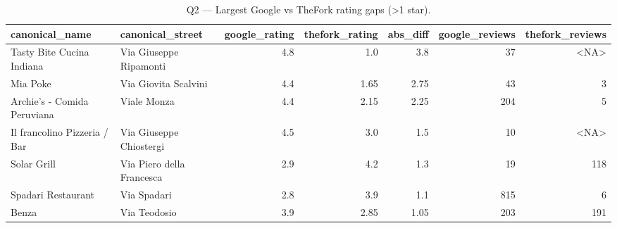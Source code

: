 \begin{table}[ht]
\centering
\caption{Q2 — Largest Google vs TheFork rating gaps (>1 star).}
\label{tab:q2_top_google_vs_thefork}
{\tiny
\begin{tabular}{llrrrrr}
\toprule
canonical\_name & canonical\_street & google\_rating & thefork\_rating & abs\_diff & google\_reviews & thefork\_reviews \\
\midrule
Tasty Bite Cucina Indiana & Via Giuseppe Ripamonti & 4.8 & 1.0 & 3.8 & 37 & <NA> \\
Mia Poke & Via Giovita Scalvini & 4.4 & 1.65 & 2.75 & 43 & 3 \\
Archie’s - Comida Peruviana & Viale Monza & 4.4 & 2.15 & 2.25 & 204 & 5 \\
Il francolino Pizzeria / Bar & Via Giuseppe Chiostergi & 4.5 & 3.0 & 1.5 & 10 & <NA> \\
Solar Grill & Via Piero della Francesca & 2.9 & 4.2 & 1.3 & 19 & 118 \\
Spadari Restaurant & Via Spadari & 2.8 & 3.9 & 1.1 & 815 & 6 \\
Benza & Via Teodosio & 3.9 & 2.85 & 1.05 & 203 & 191 \\
\bottomrule
\end{tabular}
}
\end{table}
